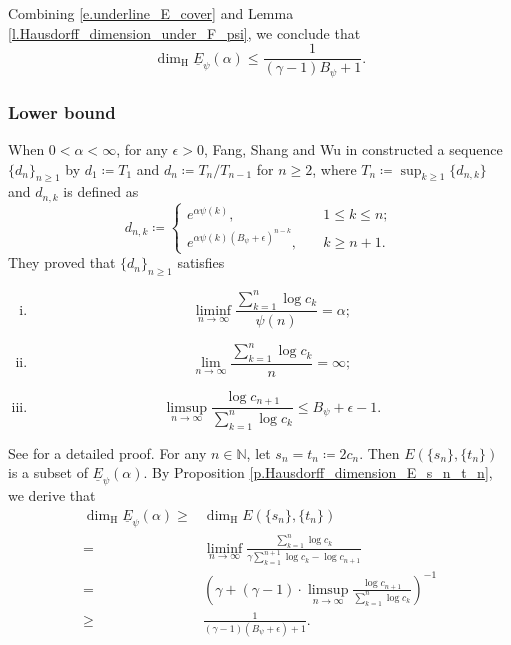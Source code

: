 \documentclass[12pt,reqno]{amsart}
\renewcommand{\=}{\coloneqq}
\theoremstyle{plain}
\begin{document}
 Combining \eqref{e.underline_E_cover} and Lemma \ref{l.Hausdorff_dimension_under_F_psi}, we conclude that
    \begin{equation*}
         \dim_{\mathrm{H}}\underline{E}_{\psi}(\alpha)
         \leq \frac{1}{(\gamma-1)B_\psi+1} .
    \end{equation*}




\subsubsection{Lower bound}\label{constrction'}
When $0<\alpha <\infty$, for any $\epsilon>0$, Fang, Shang and Wu in \cite{FSW} constructed a sequence $\{d_n\}_{n\geq 1}$ by $d_1\coloneqq T_1$ and $d_n\coloneqq T_n/T_{n-1}$ for $n \geq 2$, where $T_n\coloneqq \sup_{k\geq 1}\{d_{n,k}\}$ and $d_{n,k}$ is defined as
\begin{equation*}
        d_{n,k}\coloneqq
        \begin{cases}
        e^{\alpha\psi(k)},\quad &1\leq k\leq n; \\
        e^{\alpha\psi(k)(B_\psi+\epsilon)^{n-k}}, \quad &k\geq n+1.
        \end{cases}
    \end{equation*}
 They proved that $\{d_n\}_{n\geq 1}$ satisfies
    \begin{enumerate}[(i)]
    \item \begin{equation*}\label{e.condition_i'}
        \liminf_{n \to \infty}\frac{\sum^n_{k=1}\log c_k}{\psi (n)}=\alpha;
    \end{equation*}
    \item \begin{equation*}\label{e.condition_ii'}
        \lim_{n \to \infty}\frac{\sum^n_{k=1}\log c_k}{n}=\infty;
    \end{equation*}
    \item \begin{equation*}\label{e.condition_iii'}
        \limsup_{n \to \infty}\frac{\log c_{n+1}}{\sum^n_{k=1}\log c_k}
        \leq B_\psi+\epsilon-1.
    \end{equation*}
    \end{enumerate}
See \cite[p.\,828--829]{FSW} for a detailed proof. For any $n\in \mathbb N$, let $s_n=t_n\coloneqq 2c_n$. Then $E(\{s_n\},\{t_n\})$ is a subset of $\underline{E}_\psi(\alpha)$. By Proposition \ref{p.Hausdorff_dimension_E_s_n_t_n}, we derive that
\begin{align*}
        \dim_{\mathrm{H}}\underline{E}_{\psi}(\alpha)
         \geq&  \dim_{\mathrm{H}}E(\{s_n\},\{t_n\})\\
         =& \liminf _{n\to \infty}
                \frac{\sum_{k=1}^n\log c_k}
                {\gamma\sum_{k=1}^{n+1}\log c_k-\log c_{n+1}}\\
         =& \left(\gamma+(\gamma-1)\cdot\limsup_{n \to \infty}
         \frac{\log c_{n+1}}{\sum^n_{k=1}\log c_k}\right)^{-1}\\
         \geq& \frac{1}{(\gamma-1)(B_\psi+\epsilon)+1}.
    \end{align*}
\end{document}
